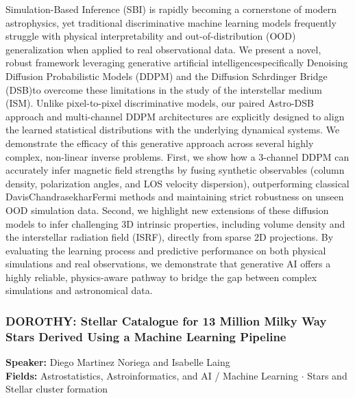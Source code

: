 Simulation-Based Inference (SBI) is rapidly becoming a cornerstone of modern astrophysics, yet traditional discriminative machine learning models frequently struggle with physical interpretability and out-of-distribution (OOD) generalization when applied to real observational data. We present a novel, robust framework leveraging generative artificial intelligencespecifically Denoising Diffusion Probabilistic Models (DDPM) and the Diffusion Schrdinger Bridge (DSB)to overcome these limitations in the study of the interstellar medium (ISM). Unlike pixel-to-pixel discriminative models, our paired Astro-DSB approach and multi-channel DDPM architectures are explicitly designed to align the learned statistical distributions with the underlying dynamical systems. We demonstrate the efficacy of this generative approach across several highly complex, non-linear inverse problems. First, we show how a 3-channel DDPM can accurately infer magnetic field strengths by fusing synthetic observables (column density, polarization angles, and LOS velocity dispersion), outperforming classical DavisChandrasekharFermi methods and maintaining strict robustness on unseen OOD simulation data. Second, we highlight new extensions of these diffusion models to infer challenging 3D intrinsic properties, including volume density and the interstellar radiation field (ISRF), directly from sparse 2D projections. By evaluating the learning process and predictive performance on both physical simulations and real observations, we demonstrate that generative AI offers a highly reliable, physics-aware pathway to bridge the gap between complex simulations and astronomical data.

\hypertarget{abstract-talk-xx}{}\label{abstract-page-talk-xx}
\subsubsection*{DOROTHY: Stellar Catalogue for 13 Million Milky Way Stars Derived Using a Machine Learning Pipeline}
\textbf{Speaker:} Diego Martinez Noriega and Isabelle Laing\\
\textbf{Fields:} Astrostatistics, Astroinformatics, and AI / Machine Learning $\cdot$ Stars and Stellar cluster formation 

